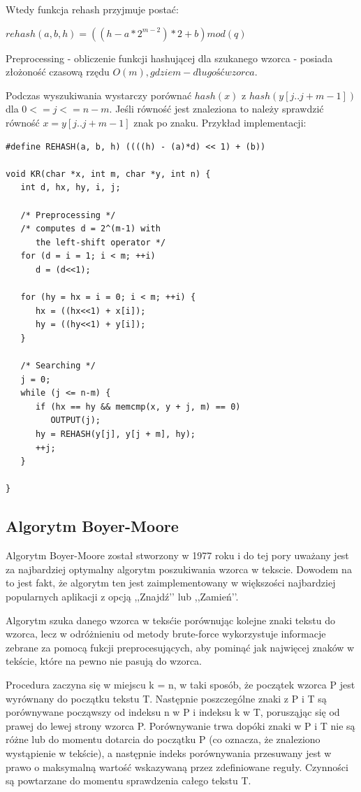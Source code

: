 \documentclass[a4paper,12pt]{article}
\begin{document}
Wtedy funkcja rehash przyjmuje postać:
\begin{center}
$rehash(a,b,h) = ((h-a*2^{m-2})*2+b)mod(q)$
\end{center}

Preprocessing - obliczenie funkcji hashującej dla szukanego wzorca - posiada złożoność czasową rzędu $O(m), gdzie m - długość wzorca.$

Podczas wyszukiwania wystarczy porównać $hash(x)$ z $hash(y[j .. j+m-1])$ dla $0 <= j <= n-m$. Jeśli równość jest znaleziona to należy sprawdzić równość $x = y[j .. j+m-1]$ znak po znaku.
\newpage
Przykład implementacji:
\begin{lstlisting}
#define REHASH(a, b, h) ((((h) - (a)*d) << 1) + (b))

void KR(char *x, int m, char *y, int n) {
   int d, hx, hy, i, j;

   /* Preprocessing */
   /* computes d = 2^(m-1) with
      the left-shift operator */
   for (d = i = 1; i < m; ++i)
      d = (d<<1);

   for (hy = hx = i = 0; i < m; ++i) {
      hx = ((hx<<1) + x[i]);
      hy = ((hy<<1) + y[i]);
   }

   /* Searching */
   j = 0;
   while (j <= n-m) {
      if (hx == hy && memcmp(x, y + j, m) == 0)
         OUTPUT(j);
      hy = REHASH(y[j], y[j + m], hy);
      ++j;
   }

}
\end{lstlisting}

\subsection{Algorytm Boyer-Moore}

Algorytm Boyer-Moore został stworzony w 1977 roku i do tej pory uważany jest za najbardziej optymalny algorytm poszukiwania wzorca w tekscie. Dowodem na to jest fakt, że algorytm ten jest zaimplementowany w większości najbardziej popularnych aplikacji z opcją ,,Znajdź’’ lub ,,Zamień’’.

Algorytm szuka danego wzorca w teksćie porównując kolejne znaki tekstu do wzorca, lecz w odróżnieniu od metody brute-force wykorzystuje informacje zebrane za pomocą fukcji preprocesujących, aby pominąć jak najwięcej znaków w tekście, które na pewno nie pasują do wzorca.

Procedura zaczyna się w miejscu k = n, w taki sposób, że początek wzorca P jest wyrównany do początku tekstu T. Następnie poszczególne znaki z P i T są porównywane począwszy od indeksu n w P i indeksu k w T, porusząjąc się od prawej do lewej strony wzorca P. Porównywanie trwa dopóki znaki w P i T nie są różne lub do momentu dotarcia do początku P (co oznacza, że znaleziono wystąpienie w tekście), a następnie indeks porównywania przesuwany jest w prawo o maksymalną wartość wskazywaną przez zdefiniowane reguły. Czynności są powtarzane do momentu sprawdzenia całego tekstu T.
\end{document}
